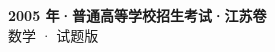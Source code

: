 \documentclass[zihao=-4, a4paper]{ctexart}
\begin{document}
\begin{center}
  {\Large\bfseries 2005 年·普通高等学校招生考试·江苏卷}\\[4pt]
  {\large 数学 · 试题版}
\end{center}
\medskip
{}

\end{document}
